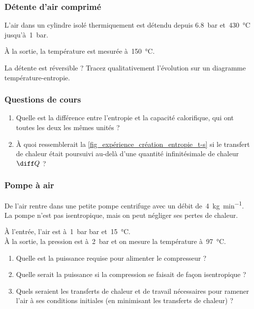 \subsubsection{Détente d’air comprimé}

	L’air dans un cylindre isolé thermiquement est détendu depuis \SI{6,8}{\bar} et~\SI{430}{\degreeCelsius} jusqu’à~\SI{1}{\bar}.

	À la sortie, la température est mesurée à~\SI{150}{\degreeCelsius}.

	La détente est réversible ? Tracez qualitativement l’évolution sur un diagramme température-entropie.

\subsubsection{Questions de cours}

	\begin{enumerate}
		\item Quelle est la différence entre l’entropie et la capacité calorifique, qui ont toutes les deux les mêmes unités ?
		\item À quoi ressemblerait la \cref{fig_expérience_création_entropie_t-s} si le transfert de chaleur était poursuivi au-delà d’une quantité infinitésimale de chaleur $\diff Q$ ?
	\end{enumerate}


\subsubsection{Pompe à air}

	De l’air rentre dans une petite pompe centrifuge avec un débit de~\SI{4}{\kilogram\per\minute}. La pompe n’est pas isentropique, mais on peut négliger ses pertes de chaleur. 

	À l’entrée, l’air est  à~\SI{1}{\bar} bar et~\SI{15}{\degreeCelsius}.\\
	À la sortie, la pression est à~\SI{2}{\bar} et on mesure la température à~\SI{97}{\degreeCelsius}.

	\begin{enumerate}
		\item Quelle est la puissance requise pour alimenter le compresseur ?
		\item Quelle serait la puissance si la compression se faisait de façon isentropique ?
		\item Quels seraient les transferts de chaleur et de travail nécessaires pour ramener l’air à ses conditions initiales (en minimisant les transferts de chaleur) ?
	\end{enumerate}

